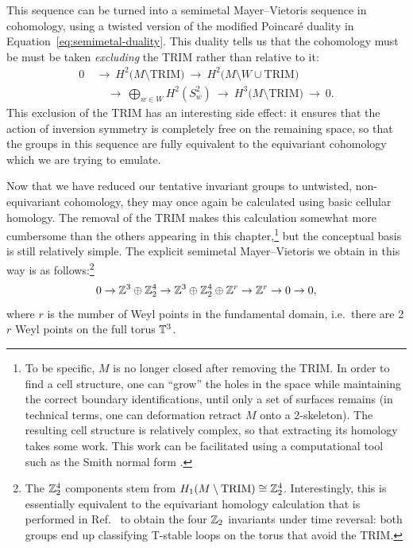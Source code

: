 This sequence can be turned into a semimetal Mayer--Vietoris sequence in cohomology, using a twisted version of the modified Poincaré duality in Equation~\eqref{eq:semimetal-duality}. This duality tells us that the cohomology must be must be taken \emph{excluding} the TRIM rather than relative to it:
\begin{align*}
	0\ &\to\ H^2\big(M\setminus\text{TRIM}\big)\ \to\ H^2\big(M\setminus W\cup\text{TRIM}\big)\ \\
	&\quad\to\ \bigoplus_{w\in W} H^2(S_w^2)\ \to\ H^3\big(M\setminus\text{TRIM}\big)\ \to\ 0.
\end{align*}
This exclusion of the TRIM has an interesting side effect: it ensures that the action of inversion symmetry is completely free on the remaining space, so that the groups in this sequence are fully equivalent to the equivariant cohomology which we are trying to emulate.

Now that we have reduced our tentative invariant groups to untwisted, non-equivariant cohomology, they may once again be calculated using basic cellular homology. The removal of the TRIM makes this calculation somewhat more cumbersome than the others appearing in this chapter,\footnote{
	To be specific, $M$ is no longer closed after removing the TRIM. In order to find a cell structure, one can ``grow'' the holes in the space while maintaining the correct boundary identifications, until only a set of surfaces remains (in technical terms, one can deformation retract $M$ onto a 2-skeleton). The resulting cell structure is relatively complex, so that extracting its homology takes some work. This work can be facilitated using a computational tool such as the Smith normal form \cite{Peltier_Homology-computation}.}
but the conceptual basis is still relatively simple. The explicit semimetal Mayer--Vietoris we obtain in this way is as follows:\footnote{
	The $\mathbb{Z}_2^4$ components stem from $H_1(M\setminus\text{TRIM})\cong\mathbb{Z}_2^4$. Interestingly, this is essentially equivalent to the equivariant homology calculation that is performed in Ref.~\cite{Thiang_equivariant} to obtain the four $\mathbb{Z}_2$ invariants under time reversal: both groups end up classifying T-stable loops on the torus that avoid the TRIM.}
\begin{equation}\label{eq:inversion-MV-explicit}
	0 \to \mathbb{Z}^3\oplus\mathbb{Z}_2^4 \to \mathbb{Z}^3\oplus\mathbb{Z}_2^4\oplus\mathbb{Z}^r \to \mathbb{Z}^r \to 0 \to 0,
\end{equation}
where $r$ is the number of Weyl points in the fundamental domain, i.e.\ there are 2$r$ Weyl points on the full torus $\mathbb{T}^3$.

